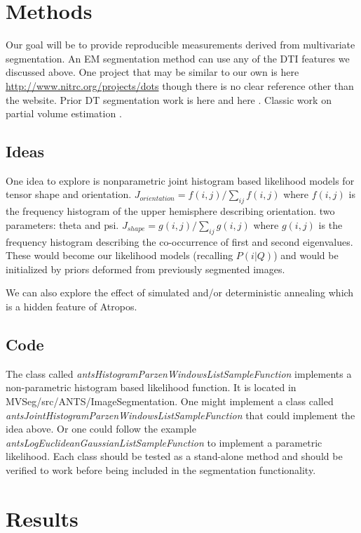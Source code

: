 \documentclass[11pt,english]{article}
\begin{document}
\section{Methods} Our goal will be to provide reproducible
measurements derived from multivariate segmentation.  An EM
segmentation method can use any of the DTI features we discussed
above.  One project that may be similar to our own is here
\url{http://www.nitrc.org/projects/dots} though there is no clear
reference other than the website.  Prior DT segmentation work is here
\citep{Lenglet2005} and here \citep{Awate2007}.  Classic work on
partial volume estimation \citep{Santago1993,Shattuck2001}.

\subsection{Ideas}
One idea to explore is nonparametric joint histogram based likelihood
models for tensor shape and orientation.  $J_{orientation} = f(i,j)/
\sum_{ij} f(i,j) $ where $f(i,j)$ is the frequency histogram of the
upper hemisphere describing orientation.  two parameters: theta and
psi.  $J_{shape} = g(i,j)/ \sum_{ij} g(i,j) $ where $g(i,j)$ is the
frequency histogram describing the co-occurrence of first and second
eigenvalues.  These would become our likelihood models (recalling
$P(i|Q)$) and would be initialized by priors deformed from previously
segmented images.

We can also explore the effect of simulated and/or deterministic
annealing which is a hidden feature of Atropos. 

\subsection{Code}
The class called {\em antsHistogramParzenWindowsListSampleFunction}
implements a non-parametric histogram based likelihood function.  It is located in MVSeg/src/ANTS/ImageSegmentation.
One might implement a class called  {\em
  antsJointHistogramParzenWindowsListSampleFunction} that could
implement the idea above.   Or one could follow the example {\em
  antsLogEuclideanGaussianListSampleFunction} to implement a
parametric likelihood.  Each class should be tested as a stand-alone
method and should be verified to work before being included in the
segmentation functionality.  

\section{Results}
\end{document}
